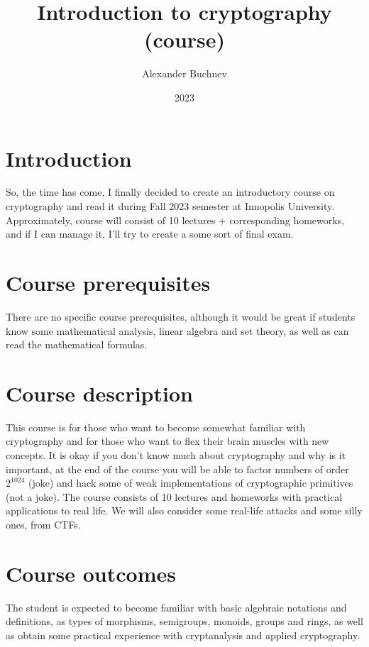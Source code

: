 \documentclass{article}
\title{Introduction to cryptography (course)}
\author{Alexander Buchnev}
\date{2023}
\begin{document}
\maketitle

\section*{Introduction}
So, the time has come, I finally decided to create an introductory course on cryptography and read it during Fall 2023 
semester at Innopolis University. Approximately, course will consist of 10 lectures + corresponding homeworks, and if I 
can manage it, I'll try to create a some sort of final exam. 

\section*{Course prerequisites}
There are no specific course prerequisites, although it would be great if students know some mathematical analysis, 
linear algebra and set theory, as well as can read the mathematical formulas.

\section*{Course description}
This course is for those who want to become somewhat familiar with cryptography and for those who want to flex their 
brain muscles with new concepts. It is okay if you don't know much about cryptography and why is it important, at the 
end of the course you will be able to factor numbers of order $2^{1024}$ (joke) and hack some of weak implementations of
cryptographic primitives (not a joke). The course consists of 10 lectures and homeworks with practical applications to 
real life. We will also consider some real-life attacks and some silly ones, from CTFs. 

\section*{Course outcomes}
The student is expected to become familiar with basic algebraic notations and definitions, as types of morphisms, 
semigroups, monoids, groups and rings, as well as obtain some practical experience with cryptanalysis and applied 
cryptography. 
\end{document}
